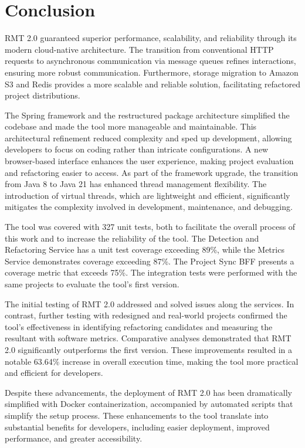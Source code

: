 \chapter{Conclusion}%
\label{conclusion}

RMT 2.0 guaranteed superior performance, scalability, and reliability through its modern cloud-native architecture. The transition from conventional HTTP requests to asynchronous communication via message queues refines interactions, ensuring more robust communication. Furthermore, storage migration to Amazon S3 and Redis provides a more scalable and reliable solution, facilitating refactored project distributions.

The Spring framework and the restructured package architecture simplified the codebase and made the tool more manageable and maintainable. This architectural refinement reduced complexity and sped up development, allowing developers to focus on coding rather than intricate configurations. A new browser-based interface enhances the user experience, making project evaluation and refactoring easier to access. As part of the framework upgrade, the transition from Java 8 to Java 21 has enhanced thread management flexibility. The introduction of virtual threads, which are lightweight and efficient, significantly mitigates the complexity involved in development, maintenance, and debugging.

The tool was covered with 327 unit tests, both to facilitate the overall process of this work and to increase the reliability of the tool. The Detection and Refactoring Service has a unit test coverage exceeding 89\%, while the Metrics Service demonstrates coverage exceeding 87\%. The Project Sync BFF presents a coverage metric that exceeds 75\%. The integration tests were performed with the same projects to evaluate the tool's first version.

The initial testing of RMT 2.0 addressed and solved issues along the services. In contrast, further testing with redesigned and real-world projects confirmed the tool's effectiveness in identifying refactoring candidates and measuring the resultant with software metrics. Comparative analyses demonstrated that RMT 2.0 significantly outperforms the first version. These improvements resulted in a notable 63.64\% increase in overall execution time, making the tool more practical and efficient for developers.

Despite these advancements, the deployment of RMT 2.0 has been dramatically simplified with Docker containerization, accompanied by automated scripts that simplify the setup process. These enhancements to the tool translate into substantial benefits for developers, including easier deployment, improved performance, and greater accessibility.

